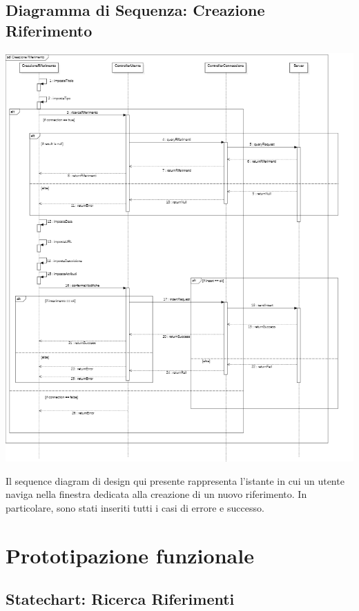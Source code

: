 \raggedright{\subsection{Diagramma di Sequenza: Creazione Riferimento}}

        \begin{center}
            \includegraphics[width=.95\textwidth]{Immagini/Alexandria/sequenceDiagramDesign2.PNG} 
        \end{center}

Il sequence diagram di design qui presente rappresenta l'istante in cui un utente naviga nella finestra dedicata alla creazione di un nuovo riferimento. In particolare, sono stati inseriti tutti i casi di errore e successo.

\raggedright{\section{Prototipazione funzionale}}

\raggedright{\subsection{Statechart: Ricerca Riferimenti}}


